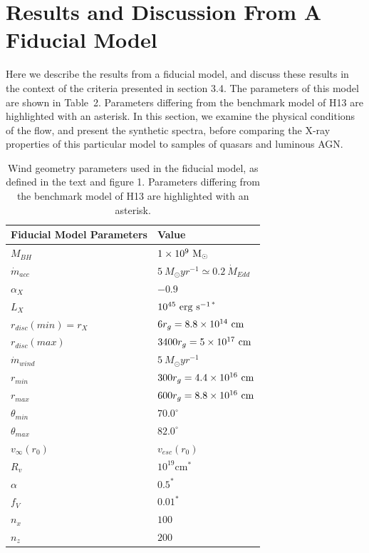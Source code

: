 \documentclass[useAMS,usenatbib]{mn2e_x}
\begin{document}




\section{Results and Discussion From A Fiducial Model}
Here we describe the results from a fiducial model,
and discuss these results in the context of the criteria 
presented in section 3.4. The parameters of this model are shown in Table~2.
Parameters differing from the benchmark model of H13 are 
highlighted with an asterisk. In this section, we examine the physical 
conditions of the flow, and present the synthetic spectra, before comparing
the X-ray properties of this particular model to samples of
quasars and luminous AGN. 

\begin{table}
\begin{tabular}{p{3cm}p{4cm}}
\hline Fiducial Model Parameters 	&	 Value \\ 
\hline \hline 
$M_{BH}$ 	 &	 $1\times 10^9~\rm{M_{\odot}}$ \\ 
$\dot{m}_{acc}$ 	 &	 $5~M_{\odot}yr^{-1} \simeq 0.2~\dot{M}_{Edd}$\\ 
$\alpha_X$ 	 &	 $-0.9$ \\ 
$L_{X} $ 	 &	 $10^{45}~\rm{erg~s^{-1}}$$^*$ \\ 
$r_{disc}(min)=r_{X}$   &	 $6r_g=8.8\times10^{14}~{\rm cm}$ \\ 
$r_{disc}(max)$   &	 $3400r_g = 5\times10^{17}~{\rm cm}$ \\ 
$\dot{m}_{wind}$  &	 $5~M_{\odot}yr^{-1}$ \\ 
$r_{min}$ 	&	 $300r_{g} = 4.4\times10^{16}~{\rm cm}$\\ 
$r_{max}$ 	&	 $600r_{g} = 8.8\times10^{16}~{\rm cm}$ \\ 
$\theta_{min}$ 	&	 $70.0^{\circ}$ \\ 
$\theta_{max}$ 	&	 $82.0^{\circ}$ \\ 
$v_{\infty}(r_0)$ 	&	 $v_{esc}(r_0)$ \\ 
$R_v$  	        &	 $10^{19}$cm$^*$ \\ 
$\alpha$ 	&	 $0.5^*$ \\
$f_V$ 	&	 $0.01^*$  \\
$n_x$ 	&	 $100$  \\
$n_z$ 	&	 $200$  \\
\end{tabular}
\caption{Wind geometry parameters 
used in the fiducial model, as defined in the text and figure 1.
Parameters differing from the benchmark model of H13 are 
highlighted with an asterisk.}
\label{wind_param}
\end{table}
\end{document}
